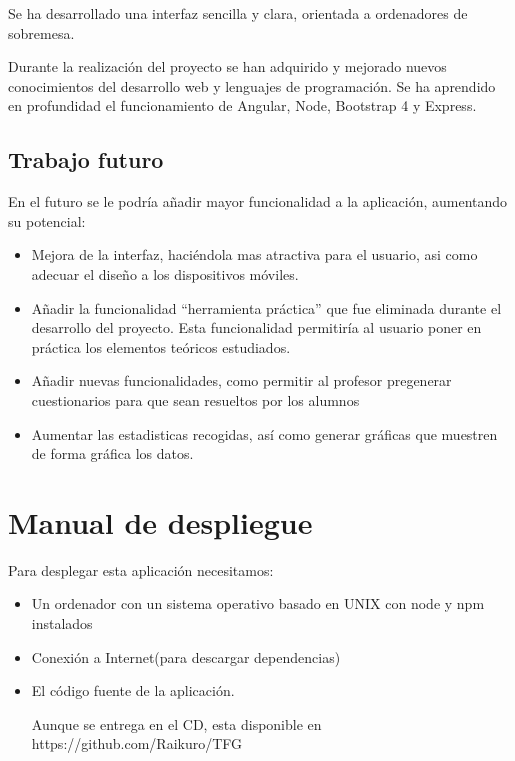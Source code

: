 \documentclass[openright,twoside,10pt]{book}
\providecommand{\tightlist}{%
  \setlength{\itemsep}{0pt}\setlength{\parskip}{0pt}}
\begin{document}
    Se ha desarrollado una interfaz sencilla y clara, orientada a
    ordenadores de sobremesa.
    
    Durante la realización del proyecto se han adquirido y mejorado nuevos
    conocimientos del desarrollo web y lenguajes de programación. Se ha
    aprendido en profundidad el funcionamiento de Angular, Node, Bootstrap 4
    y Express.
    
    \section{Trabajo futuro}\label{trabajo-futuro}
    
    En el futuro se le podría añadir mayor funcionalidad a la aplicación,
    aumentando su potencial:
    
    \begin{itemize}
    \tightlist
    \item
      Mejora de la interfaz, haciéndola mas atractiva para el usuario, asi
      como adecuar el diseño a los dispositivos móviles.
    \item
      Añadir la funcionalidad \enquote{herramienta práctica} que fue
      eliminada durante el desarrollo del proyecto. Esta funcionalidad
      permitiría al usuario poner en práctica los elementos teóricos
      estudiados.
    \item
      Añadir nuevas funcionalidades, como permitir al profesor pregenerar
      cuestionarios para que sean resueltos por los alumnos
    \item
      Aumentar las estadisticas recogidas, así como generar gráficas que
      muestren de forma gráfica los datos.
    \end{itemize}
    
    \appendix
    
    \chapter{ Manual de despliegue }
    
    Para desplegar esta aplicación necesitamos:
    
    \begin{itemize}
    \item
      Un ordenador con un sistema operativo basado en UNIX con node y npm
      instalados
    \item
      Conexión a Internet(para descargar dependencias)
    \item
      El código fuente de la aplicación.
    
      Aunque se entrega en el CD, esta disponible en
      https://github.com/Raikuro/TFG
    \end{itemize}
    
\end{document}
